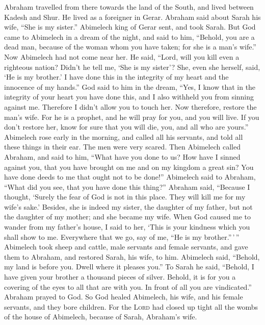  Abraham travelled from there towards the land of the
South, and lived between Kadesh and Shur. He lived as a foreigner in
Gerar.  Abraham said about Sarah his wife, ``She is my
sister.'' Abimelech king of Gerar sent, and took Sarah. 
But God came to Abimelech in a dream of the night, and said to him,
``Behold, you are a dead man, because of the woman whom you have taken;
for she is a man's wife.''  Now Abimelech had not come
near her. He said, ``Lord, will you kill even a righteous nation?
 Didn't he tell me, `She is my sister'? She, even she
herself, said, `He is my brother.' I have done this in the integrity of
my heart and the innocence of my hands.''  God said to him
in the dream, ``Yes, I know that in the integrity of your heart you have
done this, and I also withheld you from sinning against me. Therefore I
didn't allow you to touch her.  Now therefore, restore the
man's wife. For he is a prophet, and he will pray for you, and you will
live. If you don't restore her, know for sure that you will die, you,
and all who are yours.''  Abimelech rose early in the
morning, and called all his servants, and told all these things in their
ear. The men were very scared.  Then Abimelech called
Abraham, and said to him, ``What have you done to us? How have I sinned
against you, that you have brought on me and on my kingdom a great sin?
You have done deeds to me that ought not to be done!'' 
Abimelech said to Abraham, ``What did you see, that you have done this
thing?''  Abraham said, ``Because I thought, `Surely the
fear of God is not in this place. They will kill me for my wife's sake.'
 Besides, she is indeed my sister, the daughter of my
father, but not the daughter of my mother; and she became my wife.
 When God caused me to wander from my father's house, I
said to her, `This is your kindness which you shall show to me.
Everywhere that we go, say of me, ``He is my brother.''\,'\,''
 Abimelech took sheep and cattle, male servants and
female servants, and gave them to Abraham, and restored Sarah, his wife,
to him.  Abimelech said, ``Behold, my land is before you.
Dwell where it pleases you.''  To Sarah he said,
``Behold, I have given your brother a thousand pieces of silver. Behold,
it is for you a covering of the eyes to all that are with you. In front
of all you are vindicated.''  Abraham prayed to God. So
God healed Abimelech, his wife, and his female servants, and they bore
children.  For the \textsc{Lord} had closed up tight all
the wombs of the house of Abimelech, because of Sarah, Abraham's wife.

